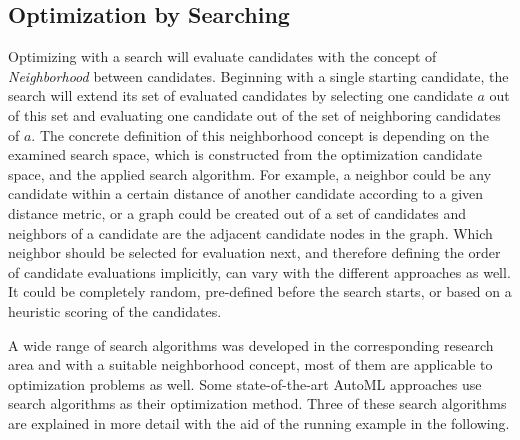 \subsection{Optimization by Searching}
\label{sec:theory:optimization:search}
Optimizing with a search will evaluate candidates with the concept of \textit{Neighborhood} between candidates.
Beginning with a single starting candidate, the search will extend its set of evaluated candidates by selecting one candidate $a$ out of this set and evaluating one candidate out of the set of neighboring candidates of $a$.\newline
The concrete definition of this neighborhood concept is depending on the examined search space, which is constructed from the optimization candidate space, and the applied search algorithm.
For example, a neighbor could be any candidate within a certain distance of another candidate according to a given distance metric, or a graph could be created out of a set of candidates and neighbors of a candidate are the adjacent candidate nodes in the graph.\newline
Which neighbor should be selected for evaluation next, and therefore defining the order of candidate evaluations implicitly, can vary with the different approaches as well.
It could be completely random, pre-defined before the search starts, or based on a heuristic scoring of the candidates.

A wide range of search algorithms was developed in the corresponding research area and with a suitable neighborhood concept, most of them are applicable to optimization problems as well.
Some state-of-the-art AutoML approaches use search algorithms as their optimization method.
Three of these search algorithms are explained in more detail with the aid of the running example in the following.

